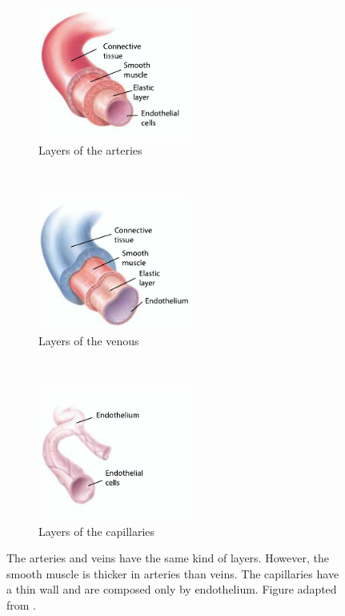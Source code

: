 \begin{figure}[!htbp]
	\centering
	\begin{subfigure}[t]{0.33\textwidth}
		\centering
		\includegraphics[width=5cm]{figure1a}
		\caption{Layers of the arteries}
		\label{fig:arteries composion}
	\end{subfigure}%
	~ 
	\begin{subfigure}[t]{0.33\textwidth}
		\centering
		\includegraphics[width=5cm]{figure1c}
		\caption{Layers of the venous}
		\label{fig:veins composition}
	\end{subfigure}
	~ 
	\begin{subfigure}[t]{0.33\textwidth}
		\centering
		\includegraphics[width=5cm, trim={0 0 2cm 0},clip]{figure1b}
		\caption{Layers of the capillaries}
		\label{fig:capillaries composition}
	\end{subfigure}
	\caption[Layers of the blood vessels]{The arteries and veins have the same kind of layers. However, the smooth muscle is thicker in arteries than veins. The capillaries have a thin wall and are composed only by endothelium. Figure adapted from \cite{johnson2001biology}.}
	\label{fig:vessels composition}
\end{figure}

